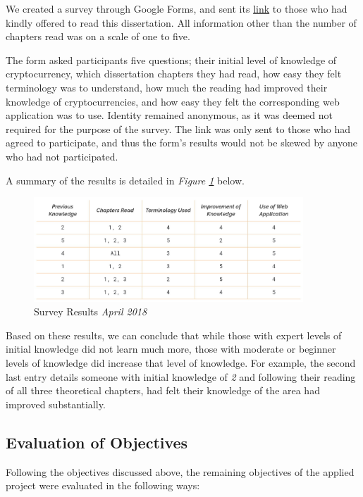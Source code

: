 We created a survey through Google Forms, and sent its \textcolor{NavyBlue}{\href{https://docs.google.com/forms/d/e/1FAIpQLSfZQVFLgzG6dHy9U46xHPHuvzhitVnsvZaT1FXDjL-pFlgQTg/viewform?usp=sf_link}{link}} to those who had kindly offered to read this dissertation. All information other than the number of chapters read was on a scale of one to five.

The form asked participants five questions; their initial level of knowledge of cryptocurrency, which dissertation chapters they had read, how easy they felt terminology was to understand, how much the reading had improved their knowledge of cryptocurrencies, and how easy they felt the corresponding web application was to use. Identity remained anonymous, as it was deemed not required for the purpose of the survey. The link was only sent to those who had agreed to participate, and thus the form's results would not be skewed by anyone who had not participated.

A summary of the results is detailed in \textit{Figure \ref{surres}} below.

\begin{figure}[h]
    \centering
    \includegraphics[width=0.9\textwidth, keepaspectratio]{img/testres.JPG}
    \caption{Survey Results \textit{April 2018}}
    \label{surres}
\end{figure}

Based on these results, we can conclude that while those with expert levels of initial knowledge did not learn much more, those with moderate or beginner levels of knowledge did increase that level of knowledge. For example, the second last entry details someone with initial knowledge of \textit{2} and following their reading of all three theoretical chapters, had felt their knowledge of the area had improved substantially.

\subsection{Evaluation of Objectives}
Following the objectives discussed above, the remaining objectives of the applied project were evaluated in the following ways: 

